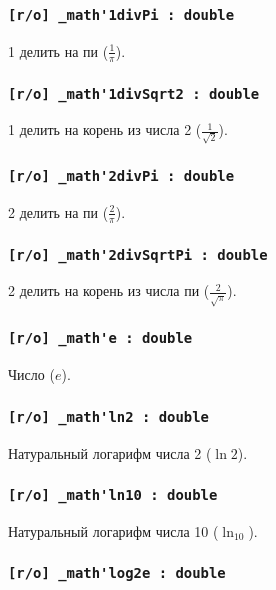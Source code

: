 \documentclass[a4paper, 14pt]{extarticle}
\begin{document}
\subsubsection{\lstinline|[r/o] _math'1divPi : double|}

1 делить на пи ($\frac{1}{\pi}$).

\subsubsection{\lstinline|[r/o] _math'1divSqrt2 : double|}

1 делить на корень из числа 2 ($\frac{1}{\sqrt{2}}$).

\subsubsection{\lstinline|[r/o] _math'2divPi : double|}

2 делить на пи ($\frac{2}{\pi}$).

\subsubsection{\lstinline|[r/o] _math'2divSqrtPi : double|}

2 делить на корень из числа пи ($\frac{2}{\sqrt{\pi}}$).

\subsubsection{\lstinline|[r/o] _math'e : double|}

Число ($e$).

\subsubsection{\lstinline|[r/o] _math'ln2 : double|}

Натуральный логарифм числа 2 ($\ln{2}$).

\subsubsection{\lstinline|[r/o] _math'ln10 : double|}

Натуральный логарифм числа 10 ($\ln_{10}$).

\subsubsection{\lstinline|[r/o] _math'log2e : double|}
\end{document}
